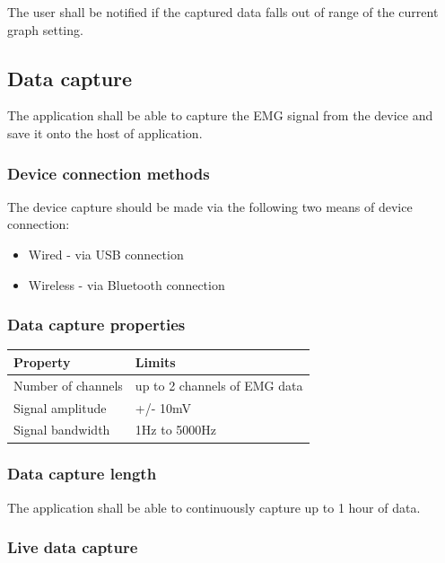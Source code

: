 \documentclass[12pt,a4paper]{article}
\begin{document}
The user shall be notified if the captured data falls out of range of the current graph setting.

\subsection{Data capture}

The application shall be able to capture the EMG signal from the device and save it onto the host of application.

\subsubsection{Device connection methods}

The device capture should be made via the following two means of device connection:

\begin{itemize}
	\item Wired - via USB connection
	\item Wireless - via Bluetooth connection
\end{itemize}

\subsubsection{Data capture properties}

\begin{table}[htbp]
	\centering
	\begin{tabular}{|l|l|}
		\hline
		\textbf{Property}  & \textbf{Limits} \\
		\hline
		Number of channels & up to 2 channels of EMG data\\
		\hline
		Signal amplitude & +/- 10mV \\
		\hline
		Signal bandwidth & 1Hz to 5000Hz \\
		\hline
	\end{tabular}
\end{table}

\subsubsection{Data capture length}

The application shall be able to continuously capture up to 1 hour of data.

\subsubsection{Live data capture}
\end{document}
